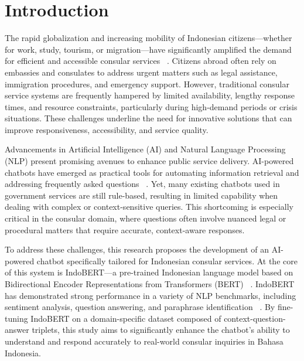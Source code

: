 \documentclass[a4paper,12pt]{report}
\begin{document}
\tableofcontents
\newpage

\listoffigures
\newpage

\listoftables
\newpage

\chapter{Introduction}
The rapid globalization and increasing mobility of Indonesian citizens—whether for work, study, tourism, or migration—have significantly amplified the demand for efficient and accessible consular services ~\cite{bps2024migration,oecd2022emigrants,wikipedia2025overseas}. Citizens abroad often rely on embassies and consulates to address urgent matters such as legal assistance, immigration procedures, and emergency support. However, traditional consular service systems are frequently hampered by limited availability, lengthy response times, and resource constraints, particularly during high-demand periods or crisis situations. These challenges underline the need for innovative solutions that can improve responsiveness, accessibility, and service quality.

Advancements in Artificial Intelligence (AI) and Natural Language Processing (NLP) present promising avenues to enhance public service delivery. AI-powered chatbots have emerged as practical tools for automating information retrieval and addressing frequently asked questions ~\cite{reuters2025,axios2024}. Yet, many existing chatbots used in government services are still rule-based, resulting in limited capability when dealing with complex or context-sensitive queries. This shortcoming is especially critical in the consular domain, where questions often involve nuanced legal or procedural matters that require accurate, context-aware responses.

To address these challenges, this research proposes the development of an AI-powered chatbot specifically tailored for Indonesian consular services. At the core of this system is IndoBERT—a pre-trained Indonesian language model based on Bidirectional Encoder Representations from Transformers (BERT) ~\cite{koto-etal-2020-indolem}. IndoBERT has demonstrated strong performance in a variety of NLP benchmarks, including sentiment analysis, question answering, and paraphrase identification ~\cite{koto-etal-2021-indobertweet,kartika2023paraphrase}. By fine-tuning IndoBERT on a domain-specific dataset composed of context-question-answer triplets, this study aims to significantly enhance the chatbot’s ability to understand and respond accurately to real-world consular inquiries in Bahasa Indonesia.
\end{document}
